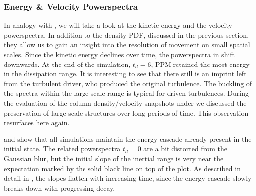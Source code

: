 \subsubsection{Energy \& Velocity Powerspectra}
In analogy with , we will take a look at the kinetic
energy and the velocity powerspectra. In addition to the density PDF, discussed
in the previous section, they allow us to gain an insight into the resolution
of movement on small spatial scales. Since the kinetic energy declines over
time, the powerspectra in  shift downwards.
At the end of the simulation, $t_d = 6$, PPM retained the most energy in the
dissipation range. It is interesting to see that there still is an imprint left from
the turbulent driver, who produced the original turbulence.
The buckling of the spectra within the large scale range is typical for
driven turbulences. During the evaluation of the column density/velocity snapshots
under  we discussed the preservation of large scale
structures over long periods of time. This observation resurfaces here again.

 and
 show that all simulations
maintain the energy cascade already present in the initial state. The related
powerspectra $t_d = 0$ are a bit distorted from the Gaussian blur, but the
initial slope of the inertial range is very near the expectation marked by the
solid black line on top of the plot. As described in detail in
, the slopes flatten with increasing time, since the energy
cascade slowly breaks down with progressing decay.


